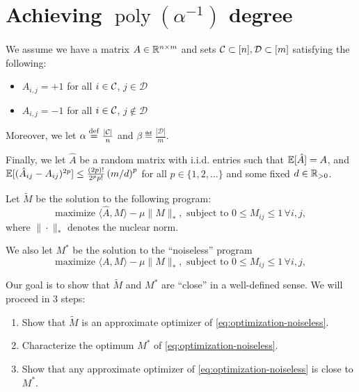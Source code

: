 \documentclass[11pt]{article}
\newcommand{\M}{\tilde{M}}
\newcommand{\A}{\hat{A}}
\DeclareMathOperator{\poly}{poly}
\newcommand{\sD}{\mathcal{D}}
\begin{document}
\section{Achieving $\poly(\alpha^{-1})$ degree}
We assume we have a matrix $A \in \mathbb{R}^{n \times m}$ and sets 
$\sC \subset [n], \sD \subset [m]$ satisfying the following:
\begin{itemize}
\item $A_{i,j} = +1$ for all $i \in \mathcal{C}$, $j \in \sD$
\item $A_{i,j} = -1$ for all $i \in \mathcal{C}$, $j \not\in \sD$
\end{itemize}
Moreover, we let $\alpha \stackrel{\mathrm{def}}{=} \frac{|\mathcal{C}|}{n}$ and $\beta \eqdef \frac{|\sD|}{m}$.

Finally, we let $\A$ be a random matrix with i.i.d. entries such that $\bE[\A] = A$, 
and $\bE[(\A_{ij}-A_{ij})^{2p}] \leq \frac{(2p)!}{2^pp!} \p{m/d}^{p}$ for all $p \in \{1,2,\ldots\}$ 
and some fixed $d \in \mathbb{R}_{>0}$.

Let $\M$ be the solution to the following program:
\begin{equation}
\label{eq:optimization-noisy}
\text{maximize } \langle \A, M \rangle - \mu \|M\|_*, \text{ subject to } 0 \leq M_{ij} \leq 1 \, \forall i,j,
\end{equation}
where $\|\cdot\|_*$ denotes the nuclear norm.

We also let $M^*$ be the solution to the ``noiseless'' program
\begin{equation}
\label{eq:optimization-noiseless}
\text{maximize } \langle A, M \rangle - \mu \|M\|_*, \text{ subject to } 0 \leq M_{ij} \leq 1 \, \forall i,j,
\end{equation}

Our goal is to show that $\M$ and $M^*$ are ``close'' in a well-defined sense. We 
will proceed in $3$ steps:
\begin{enumerate}
\item Show that $\M$ is an approximate optimizer of \eqref{eq:optimization-noiseless}.
\item Characterize the optimum $M^*$ of \eqref{eq:optimization-noiseless}.
\item Show that any approximate optimizer of \eqref{eq:optimization-noiseless} is close to $M^*$.
\end{enumerate}
\end{document}
